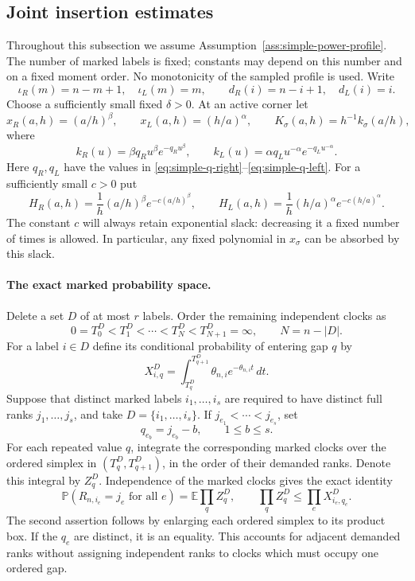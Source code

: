 \documentclass[11pt]{article}
\theoremstyle{remark}
\theoremstyle{plain}
\newcommand{\E}{\mathbb E}
\newcommand{\Pp}{\mathbb P}
\begin{document}
\subsection{Joint insertion estimates}

Throughout this subsection we assume Assumption~\ref{ass:simple-power-profile}.
The number of marked labels is fixed; constants may depend on this number
and on a fixed moment order.  No monotonicity of the sampled profile is used.
Write
\[
 \iota_R(m)=n-m+1,\quad \iota_L(m)=m,\qquad
 d_R(i)=n-i+1,\quad d_L(i)=i.
\]
Choose a sufficiently small fixed $\delta>0$.  At an active corner let
\[
 x_R(a,h)=(a/h)^\beta,\qquad x_L(a,h)=(h/a)^\alpha,
 \qquad K_\sigma(a,h)=h^{-1}k_\sigma(a/h),
\]
where
\[
 k_R(u)=\beta q_Ru^\beta e^{-q_Ru^\beta},\qquad
 k_L(u)=\alpha q_Lu^{-\alpha}e^{-q_Lu^{-\alpha}}.
\]
Here $q_R,q_L$ have the values in
\eqref{eq:simple-q-right}--\eqref{eq:simple-q-left}.
For a sufficiently small $c>0$ put
\[
 H_R(a,h)=\frac1h(a/h)^\beta e^{-c(a/h)^\beta},\qquad
 H_L(a,h)=\frac1h(h/a)^\alpha e^{-c(h/a)^\alpha}.
\]
The constant $c$ will always retain exponential slack: decreasing it a
fixed number of times is allowed.  In particular, any fixed polynomial in
$x_\sigma$ can be absorbed by this slack.

\paragraph{The exact marked probability space.}
Delete a set $D$ of at most $r$ labels.  Order the remaining independent
clocks as
\[
 0=T_0^D<T_1^D<\cdots<T_N^D<T_{N+1}^D=\infty,
 \qquad N=n-|D|.
\]
For a label $i\in D$ define its conditional probability of entering gap
$q$ by
\begin{equation}\label{eq:sp-gap-factor}
 X_{i,q}^D=\int_{T_q^D}^{T_{q+1}^D}
                  \theta_{n,i}e^{-\theta_{n,i}t}\,dt.
\end{equation}
Suppose that distinct marked labels $i_1,\ldots,i_s$ are required to have
distinct full ranks $j_1,\ldots,j_s$, and take $D=\{i_1,\ldots,i_s\}$.
If $j_{e_1}<\cdots<j_{e_s}$, set
\begin{equation}\label{eq:sp-demanded-gap}
 q_{e_b}=j_{e_b}-b,\qquad 1\le b\le s.
\end{equation}
For each repeated value $q$, integrate the corresponding marked clocks
over the ordered simplex in $(T_q^D,T_{q+1}^D)$, in the order of their
demanded ranks.  Denote this integral by $Z_q^D$.  Independence of the
marked clocks gives the exact identity
\begin{equation}\label{eq:sp-cylinder-simplex}
 \Pp(R_{n,i_e}=j_e\text{ for all }e)
       =\E\prod_{q}Z_q^D,
 \qquad
 \prod_qZ_q^D\le\prod_eX_{i_e,q_e}^D.
\end{equation}
The second assertion follows by enlarging each ordered simplex to its
product box.  If the $q_e$ are distinct, it is an equality.  This accounts
for adjacent demanded ranks without assigning independent ranks to clocks
which must occupy one ordered gap.
\end{document}
